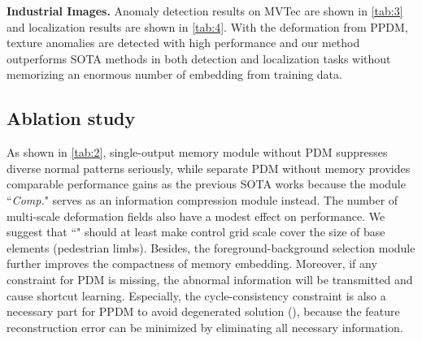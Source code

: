 \documentclass[10pt,twocolumn,letterpaper]{article}
\begin{document}
    \begin{table*}
        \renewcommand\arraystretch{0.7}
          \centering
          \caption{Pixel-level  of anomaly localization on MVTec\cite{mvtec}.
          }
          \vspace{-0.5em}
          \label{tab:4}
        \end{table*}
        
        \textbf{Industrial Images.}
        Anomaly detection results on MVTec are shown in \cref{tab:3} and localization results are shown in \cref{tab:4}. With the deformation from PPDM, texture anomalies are detected with high performance and our method outperforms SOTA methods in both detection and localization tasks without memorizing an enormous number of embedding from training data.
        
        \subsection{Ablation study}
        \label{ablation}
        As shown in \cref{tab:2}, single-output memory module without PDM suppresses diverse normal patterns seriously, 
        while separate PDM without memory provides comparable performance gains as the previous SOTA works because the module ``\textit{Comp.}" serves as an information compression module instead. The number of multi-scale deformation fields also have a modest effect on performance. We suggest that ``\textit{}" should at least make control grid scale cover the size of base elements (\eg pedestrian limbs). Besides, the foreground-background selection module further improves the compactness of memory embedding.
        Moreover, if any constraint for PDM is missing, the abnormal information will be transmitted and cause shortcut learning. Especially, the cycle-consistency constraint  is also a necessary part for PPDM to avoid degenerated solution (), because the feature reconstruction error can be minimized by eliminating all necessary information.
        
\end{document}
